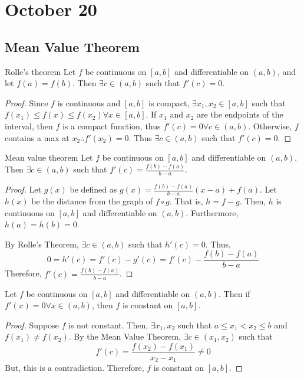 \chapter{October 20}

\section{Mean Value Theorem}
\begin{theorem}{Rolle's theorem}{}
    Let $f$ be continuous on $[a,b]$ and differentiable on $(a,b)$, and let $f(a) = f(b)$. Then $\exists c \in (a,b)$ such that $f'(c) = 0$.
\end{theorem}
\begin{proof}
    Since $f$ is continuous and $[a, b]$ is compact, $\exists x_1, x_2 \in [a, b]$ such that $f(x_1) \leq f(x) \leq f(x_2) \forall x \in [a, b]$. If $x_1$ and $x_2$ are the endpoints of the interval, then $f$ is a compact function, thus $f'(c) = 0 \forall c \in (a, b)$. Otherwise, $f$ contains a max at $x_2 \therefore f'(x_2) = 0$. Thus $\exists c \in (a, b)$ such that $f'(c) = 0$.
\end{proof}

\begin{theorem}{Mean value theorem}{}
    Let $f$ be continuous on $[a,b]$ and differentiable on $(a,b)$. Then $\exists c \in (a,b)$ such that $f'(c) = \frac{f(b) - f(a)}{b - a}$.
\end{theorem}
\begin{proof}
    Let $g(x)$ be defined as $g(x) = \frac{f(b) - f(a)}{b - a} (x - a) + f(a)$. Let $h(x)$ be the distance from the graph of $f \circ g$. That is, $h = f - g$. Then, $h$ is continuous on $[a, b]$ and differentiable on $(a, b)$. Furthermore, $h(a) = h(b) = 0$.
    
    By Rolle's Theorem, $\exists c \in (a, b)$ such that $h'(c) = 0$. Thus, $$0 = h'(c) = f'(c) - g'(c) = f'(c) - \frac{f(b) - f(a)}{b - a}$$ Therefore, $f'(c) = \frac{f(b) - f(a)}{b - a}$.
\end{proof}

\begin{theorem}
    Let $f$ be continuous on $[a,b]$ and differentiable on $(a,b)$. Then if $f'(x) = 0 \forall x \in (a, b)$, then $f$ is constant on $[a, b]$.
\end{theorem}
\begin{proof}
    Suppose $f$ is not constant. Then, $\exists x_1, x_2$ such that $a \leq x_1 < x_2 \leq b$ and $f(x_1) \neq f(x_2)$. By the Mean Value Theorem, $\exists c \in (x_1, x_2)$ such that $$f'(c) = \frac{f(x_2) - f(x_1)}{x_2 - x_1} \neq 0$$ But, this is a contradiction. Therefore, $f$ is constant on $[a, b]$.
\end{proof}

